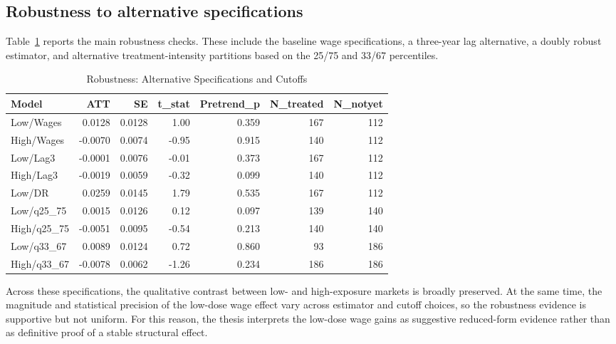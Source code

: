 \subsection{Robustness to alternative specifications}
\label{app:robustness}

Table~\ref{tab:robustness} reports the main robustness checks. These include the baseline wage specifications, a three-year lag alternative, a doubly robust estimator, and alternative treatment-intensity partitions based on the 25/75 and 33/67 percentiles.

\begin{table}[ht]
\centering
\begin{tabular}{lrrrrrr}
  \toprule
Model & ATT & SE & t\_stat & Pretrend\_p & N\_treated & N\_notyet \\ 
  \midrule
Low/Wages & 0.0128 & 0.0128 & 1.00 & 0.359 & 167 & 112 \\ 
  High/Wages & -0.0070 & 0.0074 & -0.95 & 0.915 & 140 & 112 \\ 
  Low/Lag3 & -0.0001 & 0.0076 & -0.01 & 0.373 & 167 & 112 \\ 
  High/Lag3 & -0.0019 & 0.0059 & -0.32 & 0.099 & 140 & 112 \\ 
  Low/DR & 0.0259 & 0.0145 & 1.79 & 0.535 & 167 & 112 \\ 
  Low/q25\_75 & 0.0015 & 0.0126 & 0.12 & 0.097 & 139 & 140 \\ 
  High/q25\_75 & -0.0051 & 0.0095 & -0.54 & 0.213 & 140 & 140 \\ 
  Low/q33\_67 & 0.0089 & 0.0124 & 0.72 & 0.860 & 93 & 186 \\ 
  High/q33\_67 & -0.0078 & 0.0062 & -1.26 & 0.234 & 186 & 186 \\ 
   \bottomrule
\end{tabular}
\caption{Robustness: Alternative Specifications and Cutoffs} 
\label{tab:robustness}
\end{table}


Across these specifications, the qualitative contrast between low- and high-exposure markets is broadly preserved. At the same time, the magnitude and statistical precision of the low-dose wage effect vary across estimator and cutoff choices, so the robustness evidence is supportive but not uniform. For this reason, the thesis interprets the low-dose wage gains as suggestive reduced-form evidence rather than as definitive proof of a stable structural effect.

